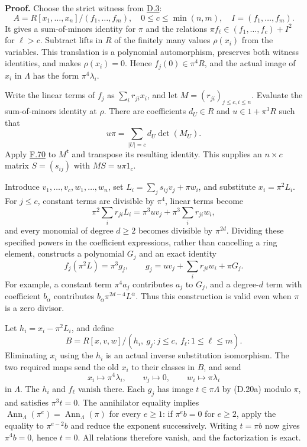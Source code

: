 \documentclass[11pt,a4paper,openany]{report}
\begin{document}
\textbf{Proof.} Choose the strict witness from \hyperref[AG-RG-S05-smoothing-definition-strictly-standard]{D.3}: \[
A=R[x_1,\ldots,x_n]/(f_1,\ldots,f_m),\quad
0\le c\le\min(n,m),\quad I=(f_1,\ldots,f_m).
\] It gives a sum-of-minors identity for \(\pi\) and the relations \(\pi f_\ell\in(f_1,\ldots,f_c)+I^2\) for \(\ell>c\). Subtract lifts in \(R\) of the finitely many values \(\rho(x_i)\) from the variables. This translation is a polynomial automorphism, preserves both witness identities, and makes \(\rho(x_i)=0\). Hence \(f_j(0)\in\pi^4R\), and the actual image of \(x_i\) in \(\Lambda\) has the form \(\pi^4\lambda_i\).

Write the linear terms of \(f_j\) as \(\sum_i r_{ji}x_i\), and let \(M=(r_{ji})_{j\le c,i\le n}\). Evaluate the sum-of-minors identity at \(\rho\). There are coefficients \(d_U\in R\) and \(u\in1+\pi^3R\) such that \[
u\pi=\sum_{|U|=c}d_U\det(M_U).
\] Apply \hyperref[AG-RG-S05-algebra-lemma-matrix-left-inverse]{F.70} to \(M^{\mathsf t}\) and transpose its resulting identity. This supplies an \(n\times c\) matrix \(S=(s_{ij})\) with \(MS=u\pi1_c\).

Introduce \(v_1,\ldots,v_c,w_1,\ldots,w_n\), set \(L_i=\sum_j s_{ij}v_j+\pi w_i\), and substitute \(x_i=\pi^2L_i\). For \(j\le c\), constant terms are divisible by \(\pi^4\), linear terms become \[
\pi^2\sum_i r_{ji}L_i
=\pi^3u v_j+\pi^3\sum_i r_{ji}w_i,
\] and every monomial of degree \(d\ge2\) becomes divisible by \(\pi^{2d}\). Dividing these specified powers in the coefficient expressions, rather than cancelling a ring element, constructs a polynomial \(G_j\) and an exact identity \[
f_j(\pi^2L)=\pi^3g_j,\qquad
g_j=u v_j+\sum_i r_{ji}w_i+\pi G_j.
\tag{D.20a}
\] For example, a constant term \(\pi^4a_j\) contributes \(a_j\) to \(G_j\), and a degree-\(d\) term with coefficient \(b_\alpha\) contributes \(b_\alpha\pi^{2d-4}L^\alpha\). Thus this construction is valid even when \(\pi\) is a zero divisor.

Let \(h_i=x_i-\pi^2L_i\), and define \[
B=R[x,v,w]/(h_i,\ g_j:j\le c,\ f_\ell:1\le\ell\le m).
\] Eliminating \(x_i\) using the \(h_i\) is an actual inverse substitution isomorphism. The two required maps send the old \(x_i\) to their classes in \(B\), and send \[
x_i\longmapsto\pi^4\lambda_i,\qquad
v_j\longmapsto0,\qquad w_i\longmapsto\pi\lambda_i
\] in \(\Lambda\). The \(h_i\) and \(f_\ell\) vanish there. Each \(g_j\) has image \(t\in\pi\Lambda\) by (D.20a) modulo \(\pi\), and satisfies \(\pi^3t=0\). The annihilator equality implies \(\operatorname{Ann}_\Lambda(\pi^e)=\operatorname{Ann}_\Lambda(\pi)\) for every \(e\ge1\): if \(\pi^e b=0\) for \(e\ge2\), apply the equality to \(\pi^{e-2}b\) and reduce the exponent successively. Writing \(t=\pi b\) now gives \(\pi^4b=0\), hence \(t=0\). All relations therefore vanish, and the factorization is exact.
\end{document}
